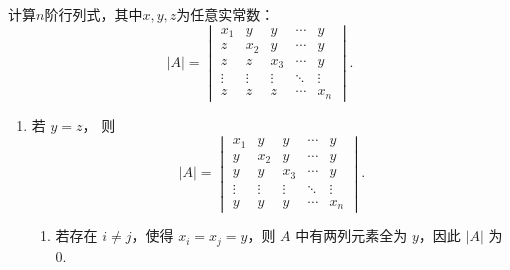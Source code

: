 \begin{exercise}
\begin{exgroup}
        \item 计算$n$阶行列式，其中$x,y,z$为任意实常数：
        \[|A|=\begin{vmatrix}
                x_1    & y      & y      & \cdots & y      \\
                z      & x_2    & y      & \cdots & y      \\
                z      & z      & x_3    & \cdots & y      \\
                \vdots & \vdots & \vdots & \ddots & \vdots \\
                z      & z      & z      & \cdots & x_n
            \end{vmatrix}.\]
        \begin{answer}
            \begin{enumerate}
                \item 若 $y = z$，
                    则
                    \[
                        |A| = \begin{vmatrix}
                            x_1    & y      & y      & \cdots & y      \\
                            y      & x_2    & y      & \cdots & y      \\
                            y      & y      & x_3    & \cdots & y      \\
                            \vdots & \vdots & \vdots & \ddots & \vdots \\
                            y      & y      & y      & \cdots & x_n
                        \end{vmatrix}.
                    \]

                    \begin{enumerate}
                        \item 若存在 $i \neq j$，使得 $x_i = x_j = y$，则 $A$ 中有两列元素全为 $y$，因此 $|A|$ 为 $0$.


\end{enumerate}
\end{enumerate}
\end{answer}
\end{exgroup}
\end{exercise}
